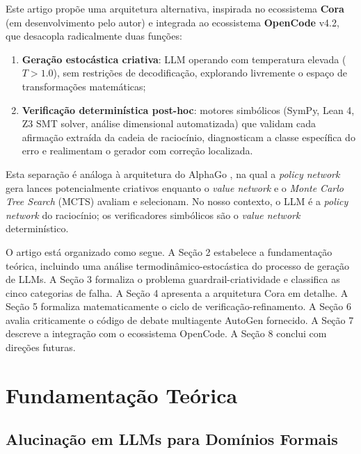 \documentclass[5p]{elsarticle}
\theoremstyle{remark}
\begin{document}
Este artigo propõe uma arquitetura alternativa, inspirada no ecossistema \textbf{Cora} (em desenvolvimento pelo autor) e integrada ao ecossistema \textbf{OpenCode} v4.2, que desacopla radicalmente duas funções:

\begin{enumerate}[label=(\roman*)]
    \item \textbf{Geração estocástica criativa}: LLM operando com temperatura elevada ($T > 1.0$), sem restrições de decodificação, explorando livremente o espaço de transformações matemáticas;
    \item \textbf{Verificação determinística post-hoc}: motores simbólicos (SymPy, Lean 4, Z3 SMT solver, análise dimensional automatizada) que validam cada afirmação extraída da cadeia de raciocínio, diagnosticam a classe específica do erro e realimentam o gerador com correção localizada.
\end{enumerate}

Esta separação é análoga à arquitetura do AlphaGo \cite{Silver2016AlphaGo}, na qual a \textit{policy network} gera lances potencialmente criativos enquanto o \textit{value network} e o \textit{Monte Carlo Tree Search} (MCTS) avaliam e selecionam. No nosso contexto, o LLM é a \textit{policy network} do raciocínio; os verificadores simbólicos são o \textit{value network} determinístico.

O artigo está organizado como segue. A Seção 2 estabelece a fundamentação teórica, incluindo uma análise termodinâmico-estocástica do processo de geração de LLMs. A Seção 3 formaliza o problema guardrail-criatividade e classifica as cinco categorias de falha. A Seção 4 apresenta a arquitetura Cora em detalhe. A Seção 5 formaliza matematicamente o ciclo de verificação-refinamento. A Seção 6 avalia criticamente o código de debate multiagente AutoGen fornecido. A Seção 7 descreve a integração com o ecossistema OpenCode. A Seção 8 conclui com direções futuras.

\section{Fundamentação Teórica}

\subsection{Alucinação em LLMs para Domínios Formais}
\end{document}
